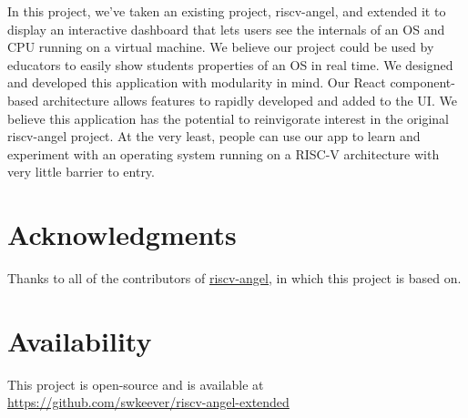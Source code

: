 In this project, we've taken an existing project, riscv-angel, and extended it to display
an interactive dashboard that lets users see the internals of an OS and CPU running on
a virtual machine.
We believe our project could be used by educators to easily show students properties of
an OS in real time.
We designed and developed this application with modularity in mind.
Our React component-based architecture allows features to rapidly developed and added to the UI.
We believe this application has the potential to reinvigorate interest in the original riscv-angel project.
At the very least, people can use our app to learn and experiment with an operating system running on a RISC-V architecture
with very little barrier to entry.


\section*{Acknowledgments}

Thanks to all of the contributors of \href{https://github.com/riscv/riscv-angel}{riscv-angel},
in which this project is based on.

\section*{Availability}

This project is open-source and is available at
\href{https://github.com/swkeever/riscv-angel-extended}
{https://github.com/swkeever/riscv-angel-extended}





